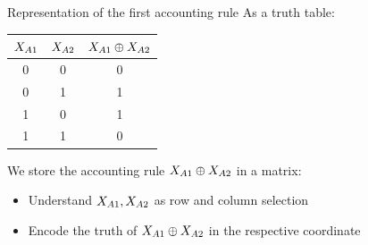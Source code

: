\documentclass{beamer}
\begin{document}
    \begin{frame}{Representation of the first accounting rule}
        As a truth table:
        \begin{center}
            \begin{tabular}{cc|c}
                $X_{A1}$ & $X_{A2}$ & $X_{A1}\oplus X_{A2}$ \\
                \hline
                0                    & 0                    & 0                                            \\
                0                    & 1                    & 1                                            \\
                1                    & 0                    & 1                                            \\
                1                    & 1                    & 0
            \end{tabular}
        \end{center}
        We store the accounting rule $X_{A1}\oplus X_{A2}$ in a matrix:
        \begin{itemize}
            \item Understand $X_{A1},X_{A2}$ as row and column selection
            \item Encode the truth of $X_{A1}\oplus X_{A2}$ in the respective coordinate
        \end{itemize}
        \begin{center}
        \end{center}
    \end{frame}
\end{document}
